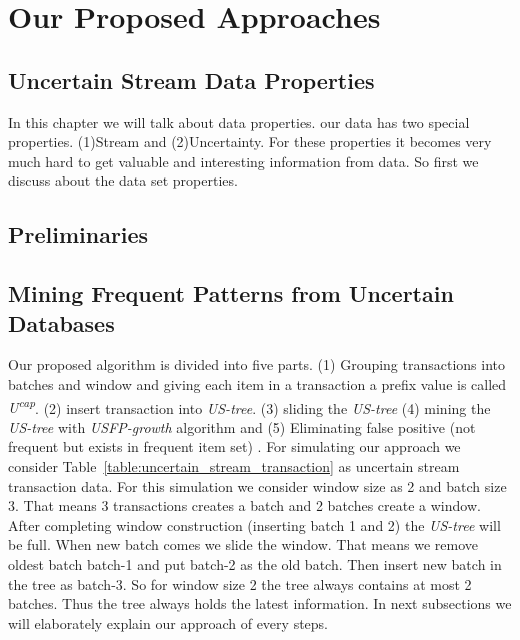 %
%
\chapter{Our Proposed Approaches}

\section{Uncertain Stream Data Properties}
In this chapter we will talk about data properties. our data has two special properties. (1)Stream and (2)Uncertainty. For these properties it becomes very much hard to get valuable and interesting information from data. So first we discuss about the data set properties.


\newpage
\section{Preliminaries}


\section{Mining Frequent Patterns from Uncertain Databases}
Our proposed algorithm is divided into five parts. (1) Grouping transactions into batches and window and giving each item in a transaction a prefix value is called \emph{U\textsuperscript{cap}}. (2) insert transaction into \emph {US-tree}. (3) sliding the \emph {US-tree} (4) mining the \emph {US-tree} with \emph{USFP-growth} algorithm and (5) Eliminating false positive (not frequent but exists in frequent item set) . For simulating our approach we consider Table~\ref{table:uncertain_stream_transaction} as uncertain stream transaction data. For this simulation we consider window size as 2 and batch size 3. That means 3 transactions creates a batch and 2 batches create a window. After completing window construction (inserting batch 1 and 2) the \emph {US-tree} will be full. When new batch comes we slide the window. That means we remove oldest batch batch-1 and put batch-2 as the old batch. Then insert new batch in the tree as batch-3. So for window size 2 the tree always contains at most 2 batches. Thus the tree always holds the latest information. In next subsections we will elaborately explain our approach of every steps.
